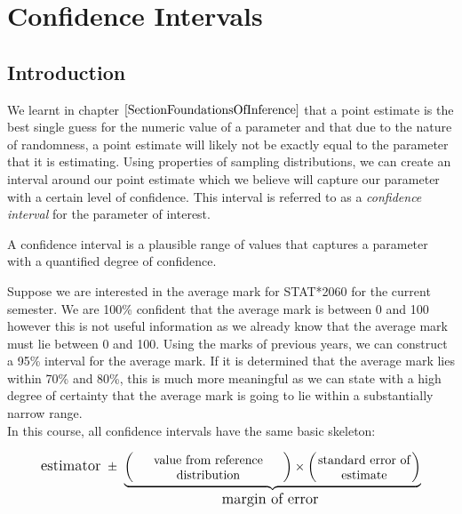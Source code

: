 \setcounter{equation}{0}
\chapter{Confidence Intervals}
\label{chapterConfidenceIntervals}

\section{Introduction}

We learnt in chapter $\ref{SectionFoundationsOfInference}$
that a point estimate is the best single guess for the numeric value of a parameter and that due to the nature of randomness, a point estimate will likely not be exactly equal to the parameter that it is estimating. Using properties of sampling distributions, we can create an interval around our point estimate which we believe will capture our parameter with a certain level of confidence. This interval is referred to as a \textit{confidence interval} for the parameter of interest.

\begin{definition}
A confidence interval is a plausible range of values that captures a parameter with a quantified degree of confidence.
\end{definition}

Suppose we are interested in the average mark for STAT*2060 for the current semester. We are 100\% confident that the average mark is between 0 and 100 however this is not useful information as we already know that the average mark must lie between 0 and 100. Using the marks of previous years, we can construct a 95\% interval for the average mark. If it is determined that the average mark lies within 70\% and 80\%, this is much more meaningful as we can state with a high degree of certainty that the average mark is going to lie within a substantially narrow range.\\

In this course, all confidence intervals have the same basic skeleton:

\begin{skeleton}[]
	\begin{equation}
	\text{\large{estimator}} ~\pm~ 	\underbrace{
						\bigg( \parbox[c]{4.25cm}{ \centering value from reference distribution } \bigg)
						\times
						\bigg( \parbox[c]{2.70cm}{ \centering standard error of estimate } \bigg)
						}_{ \text{\large{margin of error} } }
	\end{equation}
\end{skeleton}

